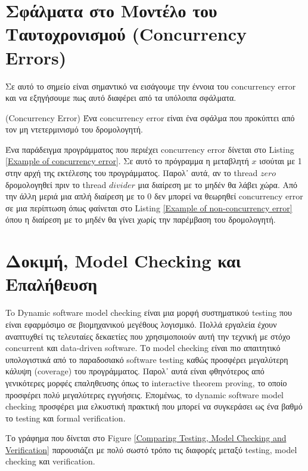 \section{Σφάλματα στο Μοντέλο του Ταυτοχρονισμού (Concurrency Errors)}
Σε αυτό το σημείο είναι σημαντικό να εισάγουμε την έννοια του concurrency error και να εξηγήσουμε πως αυτό διαφέρει από τα υπόλοιπα σφάλματα.

\begin{definition}{(Concurrency Error)}
   Ένα concurrency error είναι ένα σφάλμα που προκύπτει από τον μη ντετερμινισμό του δρομολογητή. 
\end{definition}

Ένα παράδειγμα προγράμματος που περιέχει concurrency error δίνεται στο Listing \ref{Example of concurrency error}. 
Σε αυτό το πρόγραμμα η μεταβλητή $x$ ισούται με 1 στην αρχή της εκτέλεσης του προγράμματος. Παρολ᾽ αυτά, αν το thread $zero$ δρομολογηθεί πριν το thread $divider$ 
μια διαίρεση με το μηδέν θα λάβει χώρα. Από την άλλη μεριά μια απλή διαίρεση με το 0 δεν μπορεί να θεωρηθεί concurrency error σε μια περίπτωση όπως φαίνεται στο 
Listing \ref{Example of non-concurrency error} όπου η διαίρεση με το μηδέν θα γίνει χωρίς την παρέμβαση του δρομολογητή.
%
%

\section{Δοκιμή, Model Checking και Επαλήθευση}

To Dynamic software model checking είναι μια μορφή συστηματικού testing που είναι εφαρμόσιμο σε βιομηχανικού μεγέθους λογισμικό.
Πολλά εργαλεία έχουν αναπτυχθεί τις τελευταίες δεκαετίες που χρησιμοποιούν αυτή την τεχνική με στόχο concurrent και data-driven software. 
Το model checking είναι πιο απαιτητικό υπολογιστικά από το παραδοσιακό software testing καθώς προσφέρει μεγαλύτερη 
κάλυψη (coverage) του προγράμματος. Παρολ᾽ αυτά είναι φθηνότερος από γενικότερες μορφές επαληθευσης όπως το interactive theorem
proving, το οποίο προσφέρει πολύ μεγαλύτερες εγγυήσεις.
Επομένως, το  dynamic software model checking προσφέρει μια ελκυστική πρακτική που μπορεί να συγκεράσει ως ένα βαθμό το testing και formal verification. 

Το γράφημα που δίνεται στο  Figure \ref{Comparing Testing, Model Checking and Verification} \cite{TestingvsVerification} παρουσιάζει με πολύ σωστό τρόπο
τις διαφορές μεταξύ testing, model checking και verification.

